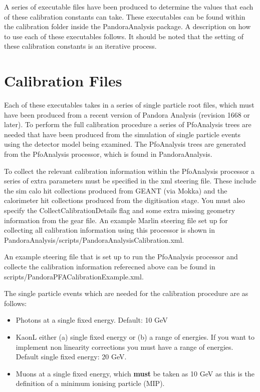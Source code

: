\documentclass[11pt, oneside]{article}   	%
\begin{document}
A series of executable files have been produced to determine the values that each of these calibration constants can take.  These executables can be found within the calibration folder inside the PandoraAnalysis package. A description on how to use each of these executables follows.  It should be noted that the setting of these calibration constants is an iterative process.

\section{Calibration Files}

Each of these executables takes in a series of single particle root files, which must have been produced from a recent version of Pandora Analysis (revision 1668 or later).  To perform the full calibration procedure a series of PfoAnalysis trees are needed that have been produced from the simulation of single particle events using the detector model being examined.  The PfoAnalysis trees are generated from the PfoAnalysis processor, which is found in PandoraAnalysis.  

To collect the relevant calibration information within the PfoAnalysis processor a series of extra parameters must be specified in the xml steering file.  These include the sim calo hit collections produced from GEANT (via Mokka) and the calorimeter hit collections produced from the digitisation stage.  You must also specify the CollectCalibrationDetails flag and some extra missing geometry information from the gear file.  An example Marlin steering file set up for collecting all calibration information using this processor is shown in PandoraAnalysis/scripts/PandoraAnalysisCalibration.xml.

An example steering file that is set up to run the PfoAnalysis processor and collecte the calibration information referecned above can be found in scripts/PandoraPFACalibrationExample.xml. 

The single particle events which are needed for the calibration procedure are as follows: 

\begin{itemize}
\item Photons at a single fixed energy.  Default: 10 GeV
\item KaonL either (a) single fixed energy or (b) a range of energies.  If you want to implement non linearity corrections you must have a range of energies.  Default single fixed energy: 20 GeV. 
\item Muons at a single fixed energy, which \textbf{must} be taken as 10 GeV as this is the definition of a minimum ionising particle (MIP).
\end{itemize}
\end{document}
